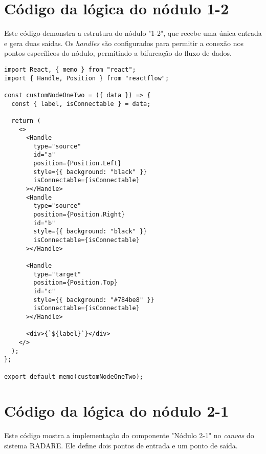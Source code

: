 \chapter{Código da lógica do nódulo 1-2}
\label{Anexo:frontCodeNodeOneTwo}

Este código demonstra a estrutura do nódulo "1-2", que recebe uma única entrada e gera duas saídas. Os \textit{handles} são configurados para permitir a conexão nos pontos específicos do nódulo, permitindo a bifurcação do fluxo de dados.

\begin{verbatim}
import React, { memo } from "react";
import { Handle, Position } from "reactflow";

const customNodeOneTwo = ({ data }) => {
  const { label, isConnectable } = data;

  return (
    <>
      <Handle
        type="source"
        id="a"
        position={Position.Left}
        style={{ background: "black" }}
        isConnectable={isConnectable}
      ></Handle>
      <Handle
        type="source"
        position={Position.Right}
        id="b"
        style={{ background: "black" }}
        isConnectable={isConnectable}
      ></Handle>

      <Handle
        type="target"
        position={Position.Top}
        id="c"
        style={{ background: "#784be8" }}
        isConnectable={isConnectable}
      ></Handle>

      <div>{`${label}`}</div>
    </>
  );
};

export default memo(customNodeOneTwo);
\end{verbatim}

\chapter{Código da lógica do nódulo 2-1}
\label{Cap:NodeTwoOneCode}

Este código mostra a implementação do componente "Nódulo 2-1" no \textit{canvas} do sistema RADARE. Ele define dois pontos de entrada e um ponto de saída.

